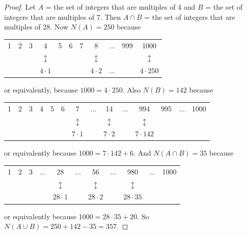 \documentclass[14pt]{extarticle}
\begin{document}
\begin{proof}
     Let $A$ = the set of integers that are multiples of 4 and $B$ = the set of integers that are multiples of 7. Then
     \(A \cap B\) = the set of integers that are multiples of 28. Now \(N(A) = 250\) because
     \begin{tabular}{ccccccccccc}
          1 & 2 & 3 & 4                & 5 & 6 & 7 & 8                & \(\ldots\) & 999 & 1000             \\
            &   &   & \(\updownarrow\) &   &   &   & \(\updownarrow\) &            &     & \(\updownarrow\) \\
            &   &   & \(4 \cdot 1\)    &   &   &   & \(4 \cdot 2\)    & \(\ldots\) &     & \(4 \cdot 250\)  \\
     \end{tabular}

     or equivalently, because \(1000 = 4 \cdot 250\). Also \(N(B) = 142\) because


     \begin{tabular}{cccccccccccccc}
          1 & 2 & 3 & 4 & 5 & 6 & 7                & \(\ldots\) & 14               & \(\ldots\) & 994              & 995 & \(\ldots\) & 1000 \\
            &   &   &   &   &   & \(\updownarrow\) &            & \(\updownarrow\) &            & \(\updownarrow\) &     &                   \\
            &   &   &   &   &   & \(7 \cdot 1\)    &            & \(7 \cdot 2\)    &            & \(7 \cdot 142\)  &     &                   \\
     \end{tabular}

     or equivalently because \(1000 = 7 \cdot 142 + 6\). And \(N(A \cap B) = 35\) because

     \begin{tabular}{ccccccccccc}
          1 & 2 & 3 & \(\ldots\) & 28               & \(\ldots\) & 56               & \(\ldots\) & 980              & \(\ldots\) & 1000 \\
            &   &   &            & \(\updownarrow\) &            & \(\updownarrow\) &            & \(\updownarrow\) &            &      \\
            &   &   &            & \(28 \cdot 1\)   &            & \(28 \cdot 2\)   &            & \(28 \cdot 35\)  &            &      \\
     \end{tabular}

     or equivalently because \(1000 = 28 \cdot 35 + 20\). So \(N(A \cup B) = 250 + 142 - 35 = 357\).
\end{proof}
\end{document}
